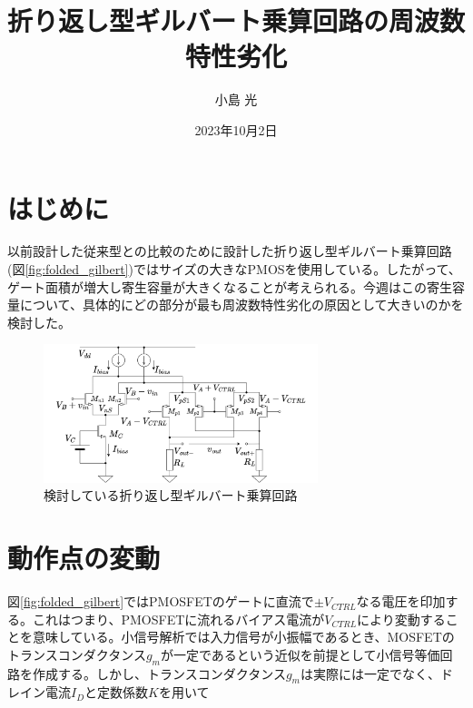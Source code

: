\documentclass[twocolumn]{jsarticle}
\begin{document}
\title{折り返し型ギルバート乗算回路の周波数特性劣化}
\author{小島 光}
\date{2023年10月2日}
\maketitle

\section{はじめに}
以前設計した従来型との比較のために設計した折り返し型ギルバート乗算回路(図\eqref{fig:folded_gilbert})ではサイズの大きなPMOSを使用している。したがって、ゲート面積が増大し寄生容量が大きくなることが考えられる。今週はこの寄生容量について、具体的にどの部分が最も周波数特性劣化の原因として大きいのかを検討した。

\begin{figure}[h]
    \begin{center}
        \includegraphics*[width=80mm]{figures/folded_gilbert.png}
        \caption{検討している折り返し型ギルバート乗算回路}
        \label{fig:folded_gilbert}
    \end{center}
\end{figure}

\section{動作点の変動}

図\eqref{fig:folded_gilbert}ではPMOSFETのゲートに直流で$\pm V_{CTRL}$なる電圧を印加する。これはつまり、PMOSFETに流れるバイアス電流が$V_{CTRL}$により変動することを意味している。小信号解析では入力信号が小振幅であるとき、MOSFETのトランスコンダクタンス$g_{m}$が一定であるという近似を前提として小信号等価回路を作成する。しかし、トランスコンダクタンス$g_{m}$は実際には一定でなく、ドレイン電流$I_{D}$と定数係数$K$を用いて
\end{document}
